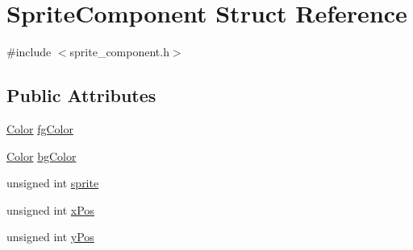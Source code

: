 \hypertarget{structSpriteComponent}{\section{Sprite\-Component Struct Reference}
\label{structSpriteComponent}
}


{\ttfamily \#include $<$sprite\-\_\-component.\-h$>$}

\subsection*{Public Attributes}
\begin{DoxyCompactItemize}
\item 
\hyperlink{classColor}{Color} \hyperlink{structSpriteComponent_a057de96f1a2de2f38e98c5fcdbb9cedc}{fg\-Color}
\item 
\hyperlink{classColor}{Color} \hyperlink{structSpriteComponent_a7343c020be982393fee296ea7c08bc0c}{bg\-Color}
\item 
unsigned int \hyperlink{structSpriteComponent_a27597e6299ef371db796928d6cdc54db}{sprite}
\item 
unsigned int \hyperlink{structSpriteComponent_af3b4dbdac3f132358f2dd983ec487a9e}{x\-Pos}
\item 
unsigned int \hyperlink{structSpriteComponent_aabf6f09bdbf8531b41ceb6f9bc20a773}{y\-Pos}
\end{DoxyCompactItemize}


